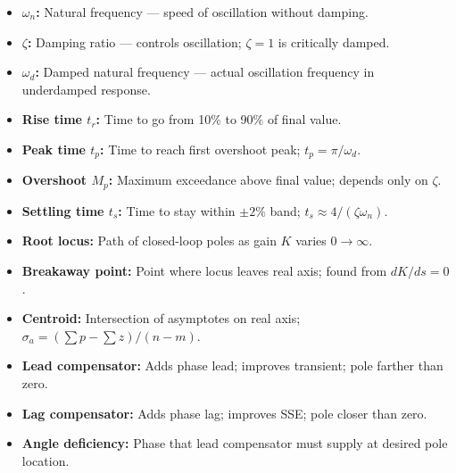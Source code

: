 \documentclass[12pt,a4paper]{article}
\begin{document}
\begin{tcolorbox}[defbox, title={\textbf{One-Line Definitions}}]
\begin{itemize}[leftmargin=*, itemsep=3pt, topsep=0pt]
  \item \textbf{$\omega_n$:} Natural frequency — speed of oscillation without damping.
  \item \textbf{$\zeta$:} Damping ratio — controls oscillation; $\zeta=1$ is critically damped.
  \item \textbf{$\omega_d$:} Damped natural frequency — actual oscillation frequency in underdamped response.
  \item \textbf{Rise time $t_r$:} Time to go from 10\% to 90\% of final value.
  \item \textbf{Peak time $t_p$:} Time to reach first overshoot peak; $t_p = \pi/\omega_d$.
  \item \textbf{Overshoot $M_p$:} Maximum exceedance above final value; depends only on $\zeta$.
  \item \textbf{Settling time $t_s$:} Time to stay within $\pm2\%$ band; $t_s \approx 4/(\zeta\omega_n)$.
  \item \textbf{Root locus:} Path of closed-loop poles as gain $K$ varies $0\to\infty$.
  \item \textbf{Breakaway point:} Point where locus leaves real axis; found from $dK/ds=0$.
  \item \textbf{Centroid:} Intersection of asymptotes on real axis; $\sigma_a = (\sum p - \sum z)/(n-m)$.
  \item \textbf{Lead compensator:} Adds phase lead; improves transient; pole farther than zero.
  \item \textbf{Lag compensator:} Adds phase lag; improves SSE; pole closer than zero.
  \item \textbf{Angle deficiency:} Phase that lead compensator must supply at desired pole location.
\end{itemize}
\end{tcolorbox}

\vspace{5pt}
\end{document}
